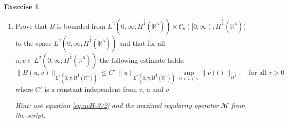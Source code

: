 \documentclass[a4paper, 12pt]{article}
\theoremstyle{plain}
\theoremstyle{definition}
\newtheorem{exercise}{Exercise}
\theoremstyle{remark}
\numberwithin{equation}{section}
\begin{document}
\begin{exercise}
\begin{enumerate}
\begin{enumerate}
{\small\sl Hint: use equation \eqref{eq:uvL^2} and Young inequality.}

\item 
Prove that $B$ is bounded from $L^2(0,\infty;\dot H^{\frac{1}{2}}({\mathds{R}}^5))\times {\mathscr{C}}_b([0,\infty);\dot H^{\frac{1}{2}}({\mathds{R}}^5))$
to the space $L^2(0,\infty;\dot H^{\frac{1}{2}}({\mathds{R}}^5))$ and that for all $u,v\in L^2(0,\infty;\dot H^{\frac{1}{2}}({\mathds{R}}^5))$
the following estimate holds:
\[
\|B(u,v)\|_{L^2(0,\tau;\dot H^{\frac{1}{2}}({\mathds{R}}^5))}\le 
C'\, \|u\|_{L^2(0,\tau;\dot H^{\frac{1}{2}}({\mathds{R}}^5))} \sup_{0<t<\tau}\|v(t)\|_{\dot H^{\frac{1}{2}}}, \quad \mbox{for all }\tau>0
\]
where $C'$ is a constant independent from $\tau$, $u$ and $v$.

{\small\sl Hint: use equation \eqref{eq:uvH-3/2} and the maximal regularity operator ${\mathscr{M}}$ from the script.}
\end{enumerate}


\end{enumerate}
\end{exercise}
\end{document}
